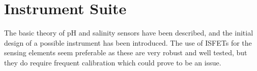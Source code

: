 \section{Instrument Suite}
The basic theory of pH and salinity sensors have been described, and the initial design of a possible instrument has been introduced. The use of ISFETs for the sensing elements seem preferable as these are very robust and well tested, but they do require frequent calibration which could prove to be an issue. 


